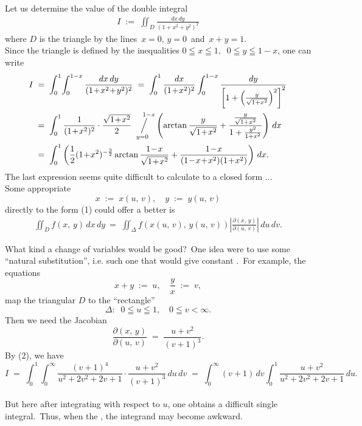 \documentclass[12pt]{article}
\newcommand{\sijoitus}[2]%
{\operatornamewithlimits{\Big/}_{\!\!\!#1}^{\,#2}}
\begin{document}
Let us determine the value of the double integral
\begin{align}
I \;:=\; \iint_D\frac{dx\,dy}{(1\!+\!x^2\!+\!y^2)^2}
\end{align}
where $D$ is the triangle  by the lines \,$x = 0$,\; $y = 0$\, and\, $x\!+\!y = 1$.\\

Since the triangle is defined by the inequalities \;$0 \leqq x \leqq 1, \;\; 0 \leqq y \leqq 1\!-\!x$,\;
one can write
\begin{align*}
I &\;=\; \int_0^1\!\int_0^{1-x}\frac{dx\,dy}{(1\!+\!x^2\!+\!y^2)^2}
    \;=\; \int_0^1\frac{dx}{(1\!+\!x^2)^2}
\int_0^{1-x}\frac{dy}{\left[1+\left(\frac{y}{\sqrt{1+x^2}}\right)^2\right]^2}\\
  &\;=\; \int_0^1\frac{1}{(1\!+\!x^2)^2}\cdot\frac{\sqrt{1\!+\!x^2}}{2}
\sijoitus{y=0}{\quad 1-x}
\left(\arctan\frac{y}{\sqrt{1\!+\!x^2}}+\frac{\frac{y}{\sqrt{1+x^2}}}{1+\frac{y^2}{1+x^2}}\right)\,dx\\
  &\;=\; \int_0^1\left(\frac{1}{2}(1\!+\!x^2)^{-\frac{3}{2}}\arctan\frac{1\!-\!x}{\sqrt{1\!+\!x^2}}
+\frac{1\!-\!x}{(1\!-\!x\!+\!x^2)(1\!+\!x^2)}\right)\,dx.
\end{align*}
The last expression seems quite difficult to calculate to a closed form ...\\

Some appropriate  
$$x \;:=\; x(u,\,v), \quad y \;:=\; y(u,\,v)$$
directly to the form (1) could offer a better  is
\begin{align}
\iint_Df(x,\,y)\,dx\,dy \:=\; 
\iint_\Delta\!f(x(u,\,v),\,y(u,\,v))
\left|\frac{\partial(x,\,y)}{\partial(u,\,v)}\right|\,du\,dv.
\end{align}

What kind a change of variables would be good?\, One idea were to use some ``natural substitution'', i.e. such one that would give constant .\, For example, the equations
$$x\!+\!y \;:=\; u, \quad \frac{y}{x} \;:=\; v,$$
map the triangular  $D$ to the ``rectangle'' 
$$\Delta\!:\;\; 0 \leqq u \leqq 1, \quad 0 \leqq v < \infty.$$
Then we need the Jacobian
$$\frac{\partial(x,\,y)}{\partial(u,\,v)} \;=\; \frac{u\!+\!v^2}{(v\!+\!1)^3}.$$
By (2), we have
$$I \;=\; 
\int_0^1\!\int_0^\infty\!\frac{(v\!+\!1)^4}{u^2\!+\!2v^2\!+\!2v\!+\!1}\!\cdot\!\frac{u\!+\!v^2}{(v\!+\!1)^3}\,du\,dv
 \;=\; \int_0^\infty\!(v\!+\!1)\,dv\int_0^1\frac{u\!+\!v^2}{u^2\!+\!2v^2\!+\!2v\!+\!1}\,du.$$\\
But here after integrating with respect to $u$, one obtains a difficult single integral.\, Thus, when the , the integrand may become awkward.\\
\end{document}
